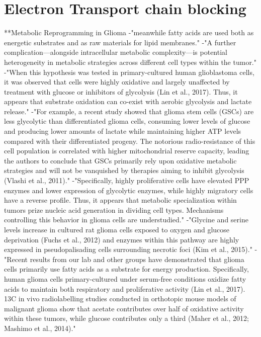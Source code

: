 \documentclass[11pt,a4paper]{article}
\begin{document}
\section{Electron Transport chain blocking}
**Metabolic Reprogramming in Glioma
-"meanwhile fatty acids are used both as energetic substrates and as raw materials for lipid membranes."
-"A further complication—alongside intracellular metabolic complexity—is potential heterogeneity in metabolic strategies across different cell types within the tumor."
-"When this hypothesis was tested in primary-cultured human glioblastoma cells, it was observed that cells were highly oxidative and largely unaffected by treatment with glucose or inhibitors of glycolysis (Lin et al., 2017). Thus, it appears that substrate oxidation can co-exist with aerobic glycolysis and lactate release."
-"For example, a recent study showed that glioma stem cells (GSCs) are less glycolytic than differentiated glioma cells, consuming lower levels of glucose and producing lower amounts of lactate while maintaining higher ATP levels compared with their differentiated progeny. The notorious radio-resistance of this cell population is correlated with higher mitochondrial reserve capacity, leading the authors to conclude that GSCs primarily rely upon oxidative metabolic strategies and will not be vanquished by therapies aiming to inhibit glycolysis (Vlashi et al., 2011)."
-"Specifically, highly proliferative cells have elevated PPP enzymes and lower expression of glycolytic enzymes, while highly migratory cells have a reverse profile. Thus, it appears that metabolic specialization within tumors prize nucleic acid generation in dividing cell types. Mechanisms controlling this behavior in glioma cells are understudied."
-"Glycine and serine levels increase in cultured rat glioma cells exposed to oxygen and glucose deprivation (Fuchs et al., 2012) and enzymes within this pathway are highly expressed in pseudopalisading cells surrounding necrotic foci (Kim et al., 2015)."
-"Recent results from our lab and other groups have demonstrated that glioma cells primarily use fatty acids as a substrate for energy production. Specifically, human glioma cells primary-cultured under serum-free conditions oxidize fatty acids to maintain both respiratory and proliferative activity (Lin et al., 2017). 13C in vivo radiolabelling studies conducted in orthotopic mouse models of malignant glioma show that acetate contributes over half of oxidative activity within these tumors, while glucose contributes only a third (Maher et al., 2012; Mashimo et al., 2014)."
\end{document}
